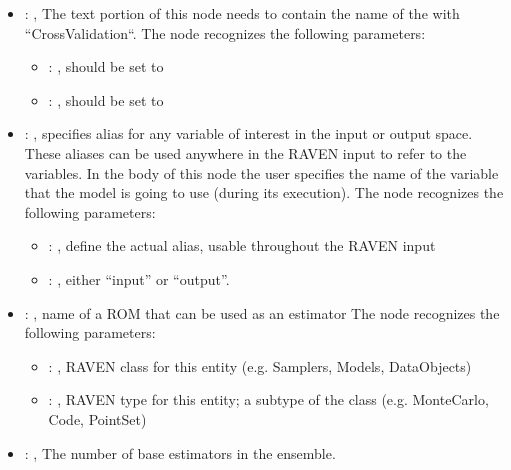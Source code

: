 \begin{itemize}
    \item {}: , 
      The text portion of this node needs to contain the name of the  with
               ``CrossValidation``.
      The  node recognizes the following parameters:
        \begin{itemize}
          \item {}: , 
            should be set to 
          \item {}: , 
            should be set to 
      \end{itemize}

    \item {}: , 
      specifies alias for         any variable of interest in the input or output space. These
      aliases can be used anywhere in the RAVEN input to         refer to the variables. In the body
      of this node the user specifies the name of the variable that the model is going to use
      (during its execution).
      The  node recognizes the following parameters:
        \begin{itemize}
          \item {}: , 
            define the actual alias, usable throughout the RAVEN input
          \item {}: , 
            either ``input'' or ``output''.
      \end{itemize}

    \item {}: , 
      name of a ROM that can be used as an estimator
      The  node recognizes the following parameters:
        \begin{itemize}
          \item {}: , 
            RAVEN class for this entity (e.g. Samplers, Models, DataObjects)
          \item {}: , 
            RAVEN type for this entity; a subtype of the class (e.g. MonteCarlo, Code, PointSet)
      \end{itemize}

    \item {}: , 
      The number of base estimators in the ensemble.


\end{itemize}
